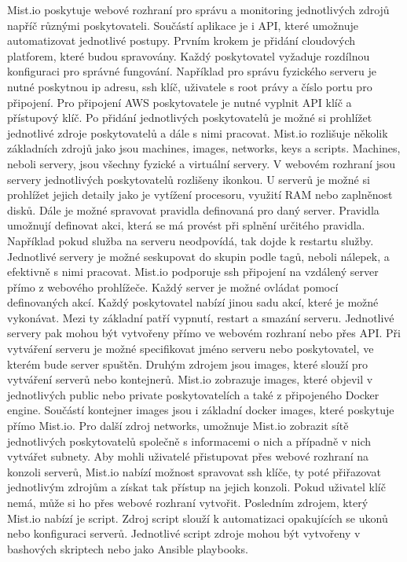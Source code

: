     Mist.io poskytuje webové rozhraní pro správu a monitoring jednotlivých zdrojů napříč různými poskytovateli. Součástí aplikace je i API, které umožnuje automatizovat jednotlivé postupy. Prvním krokem je přidání cloudových platforem, které budou spravovány. Každý poskytovatel vyžaduje rozdílnou konfiguraci pro správné fungování. Například pro správu fyzického serveru je nutné poskytnou ip adresu, ssh klíč, uživatele s root právy a číslo portu pro připojení. Pro připojení AWS poskytovatele je nutné vyplnit API klíč a přístupový klíč. Po přidání jednotlivých poskytovatelů je možné si prohlížet jednotlivé zdroje poskytovatelů a dále s nimi pracovat. Mist.io rozlišuje několik základních zdrojů jako jsou machines, images, networks, keys a scripts. Machines, neboli servery, jsou všechny fyzické a virtuální servery. V webovém rozhraní jsou servery jednotlivých poskytovatelů rozlišeny ikonkou. U serverů je možné si prohlížet jejich detaily jako je vytížení procesoru, využití RAM nebo zaplněnost disků. Dále je možné spravovat pravidla definovaná pro daný server. Pravidla umožnují definovat akci, která se má provést při splnění určitého pravidla. Například pokud služba na serveru neodpovídá, tak dojde k restartu služby. Jednotlivé servery je možné seskupovat do skupin podle tagů, neboli nálepek, a efektivně s nimi pracovat. Mist.io podporuje ssh připojení na vzdálený server přímo z webového prohlížeče. Každý server je možné ovládat pomocí definovaných akcí. Každý poskytovatel nabízí jinou sadu akcí, které je možné vykonávat. Mezi ty základní patří vypnutí, restart a smazání serveru. Jednotlivé servery pak mohou být vytvořeny přímo ve webovém rozhraní nebo přes API. Při vytváření serveru je možné specifikovat jméno serveru nebo poskytovatel, ve kterém bude server spuštěn. Druhým zdrojem jsou images, které slouží pro vytváření serverů nebo kontejnerů. Mist.io zobrazuje images, které objevil v jednotlivých public nebo private poskytovatelích a také z připojeného Docker engine. Součástí kontejner images jsou i základní docker images, které poskytuje přímo Mist.io. Pro další zdroj networks, umožnuje Mist.io zobrazit sítě jednotlivých poskytovatelů společně s informacemi o nich a případně v nich vytvářet subnety.  Aby mohli uživatelé přistupovat přes webové rozhraní na konzoli serverů, Mist.io nabízí možnost spravovat ssh klíče, ty poté přiřazovat jednotlivým zdrojům a získat tak přístup na jejich konzoli. Pokud uživatel klíč nemá, může si ho přes webové rozhraní vytvořit. Posledním zdrojem, který Mist.io nabízí je script. Zdroj script slouží k automatizaci opakujících se ukonů nebo konfiguraci serverů. Jednotlivé script zdroje mohou být vytvořeny v bashových skriptech nebo jako Ansible playbooks. 

